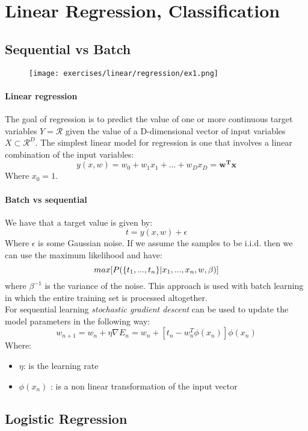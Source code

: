 \section{Linear Regression, Classification}

\subsection{Sequential vs Batch }

\begin{figure}[H]
    \centering
    \texttt{[image: exercises/linear/regression/ex1.png]}
\end{figure}
 

\paragraph{Linear regression}
The goal of regression is to predict the value of one or more continuous target variables $Y=\mathcal{R}$ given the value of a D-dimensional vector of input variables $X \subset \mathcal{R}^D$. The simplest linear model for regression is one that involves a linear combination of the input variables:
\[y(x,w)=w_0+w_1x_1+...+w_Dx_D=\bm{w^Tx}\]
Where $x_0=1$.

\paragraph{Batch vs sequential}


We have that a target value is given by:
\[t=y(x,w) + \epsilon\]
Where $\epsilon$ is some Gaussian noise. If we assume the samples to be i.i.d. then we can use the maximum likelihood and have:
\[max[P(\lbrace{t_1,...,t_n}\rbrace|x_1,...,x_n,w,\beta)]\]
where $\beta^{-1}$ is the variance of the noise. This approach is used with batch learning in which the entire training set is processed altogether.\\

For sequential learning \textit{stochastic gradient descent} can be used to update the model parameters in the following way:
\[w_{n+1}=w_n+\eta \nabla E_n= w_n +[t_n -w_n^T \phi(x_n)]\phi(x_n)\]
Where:
\begin{itemize}
\item $\eta$: is the learning rate 
\item $\phi(x_n)$ : is a non linear transformation of the input vector
\end{itemize}

\subsection{Logistic Regression }


